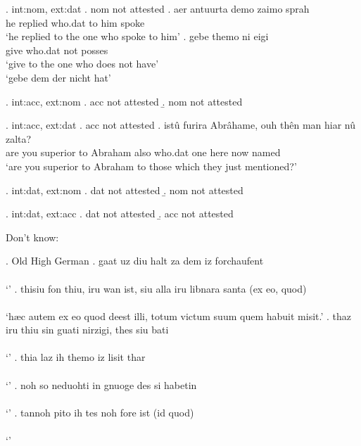 \ex. \ac{int}:\ac{nom}, \ac{ext}:\ac{dat}
\a. \ac{nom} not attested
\bg. aer antuurta demo zaimo sprah\\
 he replied\scsub{[dat]} who.\ac{dat} {to him} spoke\scsub{[nom]}\\
 `he replied to the one who spoke to him' 
\bg. gebe themo ni eigi\\
 give\scsub{[dat]} who.\ac{dat} not posses\scsub{[nom]}\\
 `give to the one who does not have' \\
 `gebe dem der nicht hat' 

\ex. \ac{int}:\ac{acc}, \ac{ext}:\ac{nom}
\a. \ac{acc} not attested
\b. \ac{nom} not attested

\ex. \ac{int}:\ac{acc}, \ac{ext}:\ac{dat}
\a. \ac{acc} not attested
\bg. istû furira Abrâhame, ouh thên man hiar nû zalta?\\
 {are you} superior\scsub{[dat]} {to Abraham} also who.\ac{dat} one here now named\scsub{[acc]}\\
 `are you superior to Abraham to those which they just mentioned?' 

\ex. \ac{int}:\ac{dat}, \ac{ext}:\ac{nom}
\a. \ac{dat} not attested
\b. \ac{nom} not attested

\ex. \ac{int}:\ac{dat}, \ac{ext}:\ac{acc}
\a. \ac{dat} not attested
\b. \ac{acc} not attested





Don't know:

\ex. Old High German
\ag. gaat uz diu halt za dem iz forchaufent\\
 \\
 `' 
\bg. thisiu fon thiu, iru wan ist, siu alla iru libnara santa (ex eo, quod)\\
 \\
 `hæc autem ex eo quod deest illi, totum victum suum quem habuit misit.' 
\bg. thaz iru thiu sin guati nirzigi, thes siu bati\\
 \\
 `' 
\bg. thia laz ih themo iz lisit thar\\
 \\
 `' 
\bg. noh so neduohti in gnuoge des si habetin\\
 \\
 `' 
\bg. tannoh pito ih tes noh fore ist (id quod)\\
 \\
 `' 

